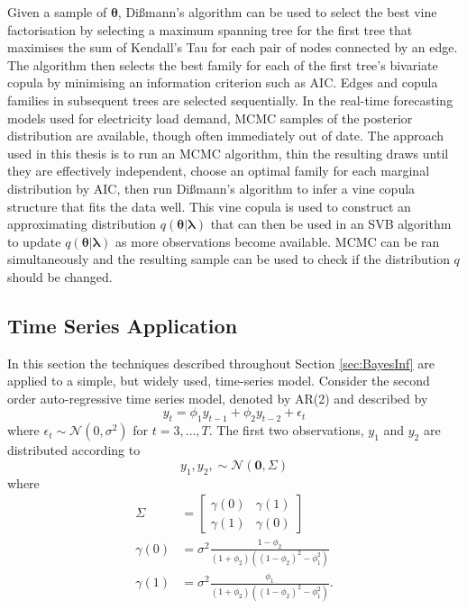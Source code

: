 \documentclass[12pt,a4paper]{article}%
\numberwithin{equation}{section}
\begin{document}
Given a sample of $\boldsymbol{\theta}$, Di{\ss}mann's algorithm \citep{Dissmann2013} can be used to select the best vine factorisation by selecting a maximum spanning tree for the first tree that maximises the sum of Kendall's Tau for each pair of nodes connected by an edge. The algorithm then selects the best family for each of the first tree's bivariate copula by minimising an information criterion such as AIC. Edges and copula families in subsequent trees are selected sequentially. In the real-time forecasting models used for electricity load demand, MCMC samples of the posterior distribution are available, though often immediately out of date. The approach used in this thesis is to run an MCMC algorithm, thin the resulting draws until they are effectively independent, choose an optimal family for each marginal distribution by AIC, then run Di{\ss}mann's algorithm to infer a vine copula structure that fits the data well. This vine copula is used to construct an approximating distribution $q(\boldsymbol{\theta} | \boldsymbol{\lambda})$ that can then be used in an SVB algorithm to update $q(\boldsymbol{\theta} | \boldsymbol{\lambda})$ as more observations become available. MCMC can be ran simultaneously and the resulting sample can be used to check if the distribution $q$ should be changed. 

\subsection{Time Series Application}

In this section the techniques described throughout Section \ref{sec:BayesInf} are applied to a simple, but widely used, time-series model. 
Consider the second order auto-regressive time series model, denoted by AR(2) and described by 
\begin{equation}
\label{AR2}
y_t = \phi_1 y_{t-1} + \phi_2 y_{t-2} + \epsilon_t
\end{equation}
where $\epsilon_t \sim \mathcal{N}(0, \sigma^2)$ for $t = 3, \dots, T$. The first two observations, $y_1$ and $y_2$ are distributed according to 
\begin{equation}
\label{AR2initial}
y_1, y_2, \sim \mathcal{N}(\boldsymbol{0}, \Sigma)
\end{equation}
where 
\begin{align}
\Sigma &= \left[ \begin{array}{cc} \gamma(0) & \gamma(1) \\ \gamma(1) & \gamma(0) \end{array} \right] \nonumber \\
\gamma(0) &= \sigma^2 \frac{1-\phi_2}{(1+\phi_2)((1-\phi_2)^2 - \phi_1^2)} \nonumber \\
\gamma(1) &= \sigma^2 \frac{\phi_1}{(1+\phi_2)((1-\phi_2)^2 - \phi_1^2)} \nonumber.
\end{align}
\end{document}

